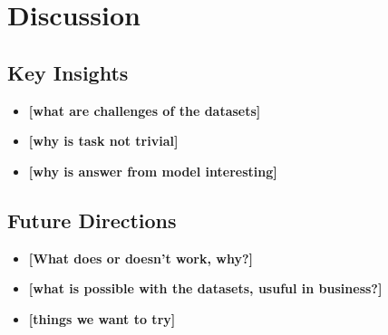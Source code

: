 \documentclass[10pt,a4paper,oneside]{article} %
\begin{document}
\section{Discussion}
\subsection{Key Insights}
\begin{itemize}
    \item \textbf{[what are challenges of the datasets]}
    \item \textbf{[why is task not trivial]}
    \item \textbf{[why is answer from model interesting]}

\end{itemize}

\subsection{Future Directions}
\begin{itemize}
    \item \textbf{[What does or doesn't work, why?]}
    \item \textbf{[what is possible with the datasets, usuful in business?]}
    \item \textbf{[things we want to try]}
\end{itemize}




\end{document}
